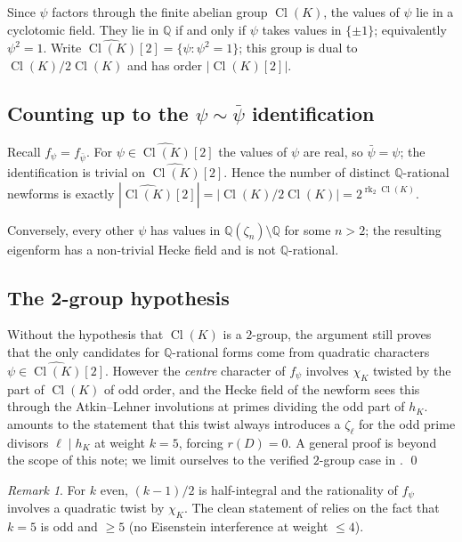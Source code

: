 \documentclass[11pt]{amsart}
\theoremstyle{definition}
\theoremstyle{remark}
\newtheorem{remark}[theorem]{Remark}
\DeclareMathOperator{\Cl}{Cl}
\DeclareMathOperator{\rk}{rk}
\newcommand{\Q}{\mathbb{Q}}
\newcommand{\chiK}{\chi_K}
\begin{document}
Since \(\psi\) factors through the finite abelian group \(\Cl(K)\), the
values of \(\psi\) lie in a cyclotomic field. They lie in \(\Q\) if and
only if \(\psi\) takes values in \(\{\pm 1\}\); equivalently
\(\psi^2 = 1\). Write
\(\widehat{\Cl(K)}[2] = \{\psi : \psi^2 = 1\}\); this group is dual to
\(\Cl(K) / 2\Cl(K)\) and has order \(|\Cl(K)[2]|\).

\subsection{Counting up to the \(\psi \sim \bar\psi\) identification}
Recall \(f_\psi = f_{\bar\psi}\). For \(\psi \in \widehat{\Cl(K)}[2]\)
the values of \(\psi\) are real, so \(\bar\psi = \psi\); the
identification is trivial on \(\widehat{\Cl(K)}[2]\). Hence the number
of distinct \(\Q\)-rational newforms is exactly
\(|\widehat{\Cl(K)}[2]| = |\Cl(K)/2\Cl(K)| = 2^{\rk_2 \Cl(K)}\).

Conversely, every other \(\psi\) has values in \(\Q(\zeta_n) \setminus
\Q\) for some \(n>2\); the resulting eigenform has a non-trivial Hecke
field and is not \(\Q\)-rational.

\subsection{The 2-group hypothesis}
Without the hypothesis that \(\Cl(K)\) is a \(2\)-group, the argument
still proves that the only candidates for \(\Q\)-rational forms come
from quadratic characters \(\psi \in \widehat{\Cl(K)}[2]\). However the
\emph{centre} character of \(f_\psi\) involves \(\chiK\) twisted by
the part of \(\Cl(K)\) of odd order, and the Hecke field of the
newform sees this through the Atkin--Lehner involutions at primes
dividing the odd part of \(h_K\).  amounts to the
statement that this twist always introduces a \(\zeta_\ell\) for the
odd prime divisors \(\ell \mid h_K\) at weight \(k=5\), forcing
\(r(D) = 0\). A general proof is beyond the scope of this note; we
limit ourselves to the verified \(2\)-group case in
. \qed

\begin{remark}\label{rem:k}
For \(k\) even, \((k-1)/2\) is half-integral and the rationality of
\(f_\psi\) involves a quadratic twist by \(\chiK\). The clean
statement of  relies on the fact that \(k=5\) is odd
and \(\ge 5\) (no Eisenstein interference at weight \(\le 4\)).
\end{remark}
\end{document}

